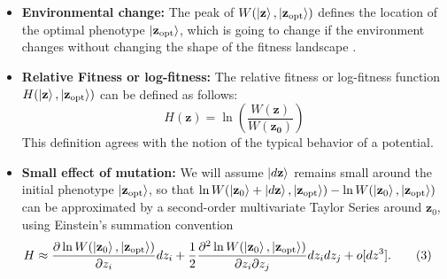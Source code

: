 \documentclass[11pt]{article}
\begin{document}
\begin{itemize}
    \item \textbf{Environmental change:} The peak of $W(\ket{\mathbf{z}}, \ket{\mathbf{z}_{\mathrm{opt}}})$ defines the location of the optimal phenotype $\ket{\mathbf{z}_{\mathrm{opt}}}$, which is going to change if the environment changes without changing the shape of the fitness landscape \cite{martin2006fitness}.
    \item \textbf{Relative Fitness or log-fitness:} The relative fitness or log-fitness function $H(\ket{\mathbf{z}}, \ket{\mathbf{z}_{\mathrm{opt}}})$ can be defined as follows:
    \begin{equation*}
        H(\mathbf{z}) = \ln \left(\frac{W(\mathbf{z})}{W(\mathbf{z_0})}\right)
    \end{equation*}
    This definition agrees with the notion of the typical behavior of a potential. 
    \item \textbf{Small effect of mutation:} We will assume  \( \ket{d\mathbf{z}} \) remains small around the initial phenotype \( \ket{\mathbf{z}_{\mathrm{opt}}} \), so that \(\ln W(\ket{\mathbf{z}_0} + \ket{d\mathbf{z}},\ket{\mathbf{z}_{\mathrm{opt}}}) - \ln W(\ket{\mathbf{z}_0},\ket{\mathbf{z}_{\mathrm{opt}}})\) can be approximated by a second-order multivariate Taylor Series around \( \mathbf{z}_0 \), using Einstein's summation convention 
    \begin{align*}
    H &\approx   \frac{\partial \ln W(\ket{\mathbf{z}_0}, \ket{\mathbf{z}_{\mathrm{opt}}})}{\partial z_i} dz_i  + \frac{1}{2}  \frac{\partial^2 \ln W(\ket{\mathbf{z}_0}, \ket{\mathbf{z}_{\mathrm{opt}}})}{\partial z_i \partial z_j} dz_i dz_j + o[dz^3]. \tag{3}
    \end{align*} 

\end{itemize}
\end{document}
